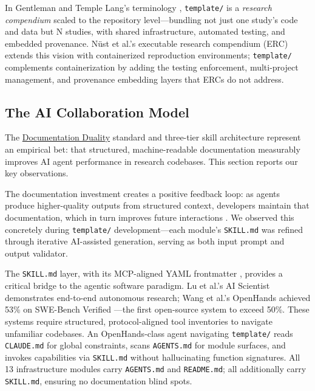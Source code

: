 \documentclass[
]{article}
\begin{document}
In Gentleman and Temple Lang's terminology
\citep{gentleman2007research}, \texttt{template/} is a \emph{research
compendium} scaled to the repository level---bundling not just one
study's code and data but N studies, with shared infrastructure,
automated testing, and embedded provenance. Nüst et al.'s executable
research compendium (ERC) \citep{nust2017containerization} extends this
vision with containerized reproduction environments; \texttt{template/}
complements containerization by adding the testing enforcement,
multi-project management, and provenance embedding layers that ERCs do
not address.

\newpage

\subsection{The AI Collaboration
Model}\label{the-ai-collaboration-model}

The
\href{03c_documentation.md\#documentation-duality-and-ai-collaboration}{Documentation
Duality} standard and three-tier skill architecture represent an
empirical bet: that structured, machine-readable documentation
measurably improves AI agent performance in research codebases. This
section reports our key observations.

The documentation investment creates a positive feedback loop: as agents
produce higher-quality outputs from structured context, developers
maintain that documentation, which in turn improves future interactions
\citep{lau2025aicoding}. We observed this concretely during
\texttt{template/} development---each module's \texttt{SKILL.md} was
refined through iterative AI-assisted generation, serving as both input
prompt and output validator.

The \texttt{SKILL.md} layer, with its MCP-aligned YAML frontmatter
\citep{anthropic2024mcp}, provides a critical bridge to the agentic
software paradigm. Lu et al.'s AI Scientist \citep{lu2024aiscientist}
demonstrates end-to-end autonomous research; Wang et al.'s OpenHands
\citep{wang2024opendevin} achieved 53\% on SWE-Bench Verified
\citep{jimenez2024swebench}---the first open-source system to exceed
50\%. These systems require structured, protocol-aligned tool
inventories to navigate unfamiliar codebases. An OpenHands-class agent
navigating \texttt{template/} reads \texttt{CLAUDE.md} for global
constraints, scans \texttt{AGENTS.md} for module surfaces, and invokes
capabilities via \texttt{SKILL.md} without hallucinating function
signatures. All 13 infrastructure modules carry \texttt{AGENTS.md} and
\texttt{README.md}; all additionally carry \texttt{SKILL.md}, ensuring
no documentation blind spots.
\end{document}

